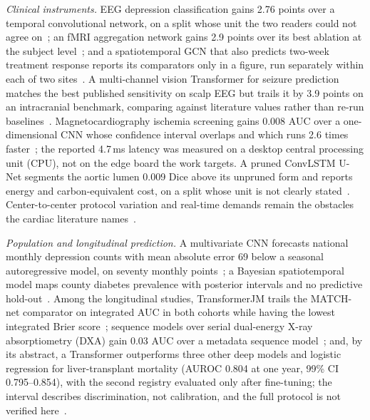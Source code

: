 \documentclass[journal]{IEEEtran}
\begin{document}
\emph{Clinical instruments.} EEG depression classification gains 2.76 points over a temporal convolutional network, on a split whose unit the two readers could not agree on~\cite{2}; an fMRI aggregation network gains 2.9 points over its best ablation at the subject level~\cite{9}; and a spatiotemporal GCN that also predicts two-week treatment response reports its comparators only in a figure, run separately within each of two sites~\cite{4}. A multi-channel vision Transformer for seizure prediction matches the best published sensitivity on scalp EEG but trails it by 3.9 points on an intracranial benchmark, comparing against literature values rather than re-run baselines~\cite{hussein2022seizure}. Magnetocardiography ischemia screening gains 0.008 AUC over a one-dimensional CNN whose confidence interval overlaps and which runs 2.6 times faster~\cite{li2026edgeischemia}; the reported 4.7\,ms latency was measured on a desktop central processing unit (CPU), not on the edge board the work targets. A pruned ConvLSTM U-Net segments the aortic lumen 0.009 Dice above its unpruned form and reports energy and carbon-equivalent cost, on a split whose unit is not clearly stated~\cite{5}. Center-to-center protocol variation and real-time demands remain the obstacles the cardiac literature names~\cite{6}.

\emph{Population and longitudinal prediction.} A multivariate CNN forecasts national monthly depression counts with mean absolute error 69 below a seasonal autoregressive model, on seventy monthly points~\cite{3}; a Bayesian spatiotemporal model maps county diabetes prevalence with posterior intervals and no predictive hold-out~\cite{XiaoLi2016DiabetesSpatiotemporal}. Among the longitudinal studies, TransformerJM trails the MATCH-net comparator on integrated AUC in both cohorts while having the lowest integrated Brier score~\cite{lin2022deep}; sequence models over serial dual-energy X-ray absorptiometry (DXA) gain 0.03 AUC over a metadata sequence model~\cite{glaser2022deep}; and, by its abstract, a Transformer outperforms three other deep models and logistic regression for liver-transplant mortality (AUROC 0.804 at one year, 99\% CI 0.795--0.854), with the second registry evaluated only after fine-tuning; the interval describes discrimination, not calibration, and the full protocol is not verified here~\cite{nitski2021long}.
\end{document}
